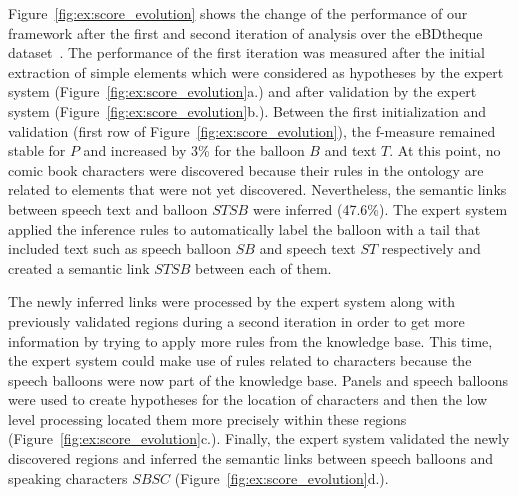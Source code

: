 Figure~\ref{fig:ex:score_evolution} shows the change of the performance of our framework after the first and second iteration of analysis over the eBDtheque dataset~\cite{Guerin2013}.
The performance of the first iteration was measured after the initial extraction of simple elements which were considered as hypotheses by the expert system (Figure~\ref{fig:ex:score_evolution}a.) and after validation by the expert system (Figure~\ref{fig:ex:score_evolution}b.).
Between the first initialization and validation (first row of Figure~\ref{fig:ex:score_evolution}), the f-measure remained stable for $P$ and increased by 3\% for the balloon $B$ and text $T$.
At this point, no comic book characters were discovered because their rules in the ontology are related to elements that were not yet discovered.
Nevertheless, the semantic links between speech text and balloon $STSB$ were inferred (47.6\%).
The expert system applied the inference rules to automatically label the balloon with a tail that included text such as speech balloon $SB$ and speech text $ST$ respectively and created a semantic link $STSB$ between each of them.

The newly inferred links were processed by the expert system along with previously validated regions during a second iteration in order to get more information by trying to apply more rules from the knowledge base.
This time, the expert system could make use of rules related to characters because the speech balloons were now part of the knowledge base.
Panels and speech balloons were used to create hypotheses for the location of characters and then the low level processing located them more precisely within these regions (Figure~\ref{fig:ex:score_evolution}c.).
Finally, the expert system validated the newly discovered regions and inferred the semantic links between speech balloons and speaking characters $SBSC$ (Figure~\ref{fig:ex:score_evolution}d.).


